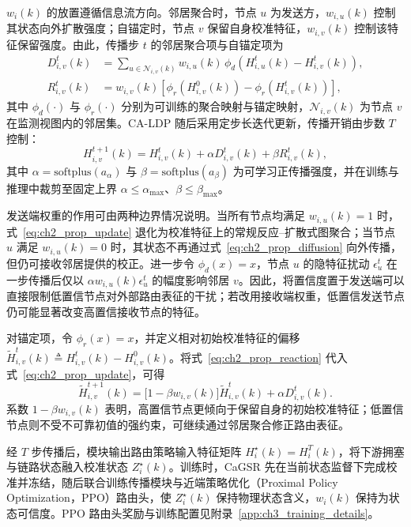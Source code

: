 $w_i(k)$ 的放置遵循信息流方向。邻居聚合时，节点 $u$ 为发送方，$w_{i,u}(k)$ 控制其状态向外扩散强度；自锚定时，节点 $v$ 保留自身校准特征，$w_{i,v}(k)$ 控制该特征保留强度。由此，传播步 $t$ 的邻居聚合项与自锚定项为
\begin{align}
D_{i,v}^{t}(k)
&=
\sum_{u\in\mathcal N_{i,v}(k)}
w_{i,u}(k)\,
\phi_d
\left(
H_{i,u}^{t}(k)-H_{i,v}^{t}(k)
\right),
\label{eq:ch2_prop_diffusion}
\\
R_{i,v}^{t}(k)
&=
w_{i,v}(k)
\left[
\phi_r
\left(
H_{i,v}^{0}(k)
\right)
-
\phi_r
\left(
H_{i,v}^{t}(k)
\right)
\right],
\label{eq:ch2_prop_reaction}
\end{align}
其中 $\phi_d(\cdot)$ 与 $\phi_r(\cdot)$ 分别为可训练的聚合映射与锚定映射，$\mathcal N_{i,v}(k)$ 为节点 $v$ 在监测视图内的邻居集。CA-LDP 随后采用定步长迭代更新，传播开销由步数 $T$ 控制：
\begin{equation}
H_{i,v}^{t+1}(k)
=
H_{i,v}^{t}(k)
+
\alpha D_{i,v}^{t}(k)
+
\beta R_{i,v}^{t}(k),
\label{eq:ch2_prop_update}
\end{equation}
其中 $\alpha=\mathrm{softplus}(a_\alpha)$ 与 $\beta=\mathrm{softplus}(a_\beta)$ 为可学习正传播强度，并在训练与推理中裁剪至固定上界 $\alpha\le\alpha_{\max}$、$\beta\le\beta_{\max}$。

发送端权重的作用可由两种边界情况说明。当所有节点均满足 $w_{i,u}(k)=1$ 时，式~\eqref{eq:ch2_prop_update} 退化为校准特征上的常规反应--扩散式图聚合；当节点 $u$ 满足 $w_{i,u}(k)=0$ 时，其状态不再通过式~\eqref{eq:ch2_prop_diffusion} 向外传播，但仍可接收邻居提供的校正。进一步令 $\phi_d(x)=x$，节点 $u$ 的隐特征扰动 $\epsilon_u^t$ 在一步传播后仅以 $\alpha w_{i,u}(k)\epsilon_u^t$ 的幅度影响邻居 $v$。因此，将置信度置于发送端可以直接限制低置信节点对外部路由表征的干扰；若改用接收端权重，低置信发送节点仍可能显著改变高置信接收节点的特征。

对锚定项，令 $\phi_r(x)=x$，并定义相对初始校准特征的偏移 $\widetilde H_{i,v}^{t}(k)\triangleq H_{i,v}^{t}(k)-H_{i,v}^{0}(k)$。将式~\eqref{eq:ch2_prop_reaction} 代入式~\eqref{eq:ch2_prop_update}，可得
\begin{equation}
\widetilde H_{i,v}^{t+1}(k)
=\big[1-\beta w_{i,v}(k)\big]\widetilde H_{i,v}^{t}(k)
+\alpha D_{i,v}^{t}(k).
\label{eq:ch2_prop_contraction}
\end{equation}
系数 $1-\beta w_{i,v}(k)$ 表明，高置信节点更倾向于保留自身的初始校准特征；低置信节点则不受不可靠初值的强约束，可继续通过邻居聚合修正路由表征。

经 $T$ 步传播后，模块输出路由策略输入特征矩阵 $H_i^\star(k)=H_i^T(k)$，将下游拥塞与链路状态融入校准状态 $Z_i^\star(k)$。训练时，CaGSR 先在当前状态监督下完成校准并冻结，随后联合训练传播模块与近端策略优化（Proximal Policy Optimization，PPO）路由头，使 $Z_i^\star(k)$ 保持物理状态含义，$w_i(k)$ 保持为状态可信度。PPO 路由头奖励与训练配置见附录~\ref{app:ch3_training_details}。


